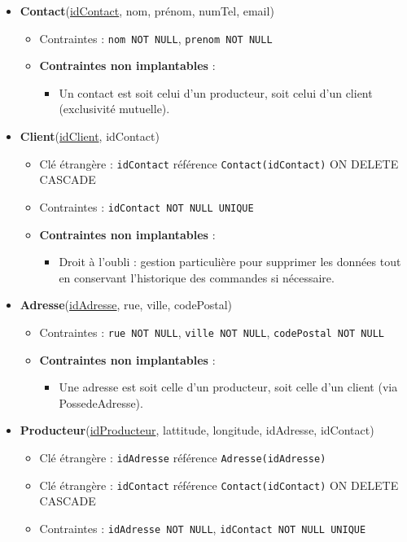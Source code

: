 \begin{itemize}
    \item \textbf{Contact}(\underline{idContact}, nom, prénom, numTel, email)
    \begin{itemize}
        \item Contraintes : \texttt{nom NOT NULL}, \texttt{prenom NOT NULL}
        \item \textbf{Contraintes non implantables} :
        \begin{itemize}
            \item Un contact est soit celui d'un producteur, soit celui d'un client (exclusivité mutuelle).
        \end{itemize}
    \end{itemize}
    
    \item \textbf{Client}(\underline{idClient}, idContact)
    \begin{itemize}
        \item Clé étrangère : \texttt{idContact} référence \texttt{Contact(idContact)} ON DELETE CASCADE
        \item Contraintes : \texttt{idContact NOT NULL UNIQUE}
        \item \textbf{Contraintes non implantables} :
        \begin{itemize}
            \item Droit à l'oubli : gestion particulière pour supprimer les données tout en conservant l'historique des commandes si nécessaire.
        \end{itemize}
    \end{itemize}
    
    \item \textbf{Adresse}(\underline{idAdresse}, rue, ville, codePostal)
    \begin{itemize}
        \item Contraintes : \texttt{rue NOT NULL}, \texttt{ville NOT NULL}, \texttt{codePostal NOT NULL}
        \item \textbf{Contraintes non implantables} :
        \begin{itemize}
            \item Une adresse est soit celle d'un producteur, soit celle d'un client (via PossedeAdresse).
        \end{itemize}
    \end{itemize}
    
    \item \textbf{Producteur}(\underline{idProducteur}, lattitude, longitude, idAdresse, idContact)
    \begin{itemize}
        \item Clé étrangère : \texttt{idAdresse} référence \texttt{Adresse(idAdresse)}
        \item Clé étrangère : \texttt{idContact} référence \texttt{Contact(idContact)} ON DELETE CASCADE
        \item Contraintes : \texttt{idAdresse NOT NULL}, \texttt{idContact NOT NULL UNIQUE}
    \end{itemize}
    

\end{itemize}
